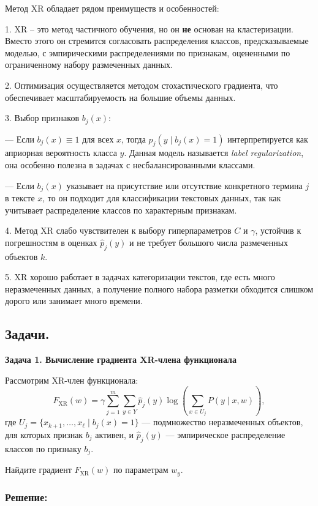 Метод XR обладает рядом преимуществ и особенностей:

1. XR – это метод частичного обучения, но он \textbf{не} основан на кластеризации. Вместо этого он стремится согласовать распределения классов, предсказываемые моделью, с эмпирическими распределениями по признакам, оцененными по ограниченному набору размеченных данных.

2. Оптимизация осуществляется методом стохастического градиента, что обеспечивает масштабируемость на большие объемы данных.

3. Выбор признаков $b_j(x)$:

--- Если $b_j(x) \equiv 1$ для всех $x$, тогда $p_j(y \mid b_j(x)=1)$ интерпретируется как априорная вероятность класса $y$. Данная модель называется \textit{label regularization}, она особенно полезна в задачах с несбалансированными классами.

--- Если $b_j(x)$ указывает на присутствие или отсутствие конкретного термина $j$ в тексте $x$, то он подходит для классификации текстовых данных, так как учитывает распределение классов по характерным признакам.

4. Метод XR слабо чувствителен к выбору гиперпараметров $C$ и $\gamma$, устойчив к погрешностям в оценках $\hat{p}_j(y)$ и не требует большого числа размеченных объектов $k$.

5. XR хорошо работает в задачах категоризации текстов, где есть много неразмеченных данных, а получение полного набора разметки обходится слишком дорого или занимает много времени.

\subsection{Задачи.}

\bigskip

\noindent\textbf{Задача 1. Вычисление градиента XR-члена функционала}

Рассмотрим XR-член функционала:
\[
    F_{\text{XR}}(w) = \gamma \sum_{j=1}^m \sum_{y \in Y} \hat{p}_j(y) \log\left(\sum_{x \in U_j} P(y \mid x,w)\right),
\]
где $U_j = \{ x_{k+1}, \ldots, x_{\ell} \mid b_j(x)=1 \}$ — подмножество неразмеченных объектов, для которых признак $b_j$ активен, и $\hat{p}_j(y)$ — эмпирическое распределение классов по признаку $b_j$.

Найдите градиент $F_{\text{XR}}(w)$ по параметрам $w_y$.

\subsubsection*{Решение:}

